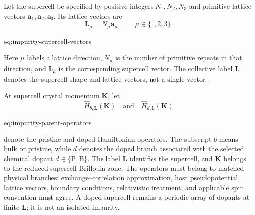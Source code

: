 Let the supercell be specified by positive integers
$N_1,N_2,N_3$ and primitive lattice vectors
$\mathbf a_1,\mathbf a_2,\mathbf a_3$. Its lattice vectors are
\begin{equation}
    \mathbf L_{\mu}=N_{\mu}\mathbf a_{\mu},
    \qquad \mu\in\{1,2,3\}.
    \label{eq:impurity-supercell-vectors}
\end{equation}
\begin{equationterms}{eq:impurity-supercell-vectors}
\end{equationterms}
Here $\mu$ labels a lattice direction, $N_{\mu}$ is the number of primitive
repeats in that direction, and $\mathbf L_{\mu}$ is the corresponding
supercell vector. The collective label $\mathbf L$ denotes the supercell shape
and lattice vectors, not a single vector.

At supercell crystal momentum $\mathbf K$, let
\begin{equation}
    \widehat H_{b,\mathbf L}(\mathbf K)
    \quad\text{and}\quad
    \widehat H_{d,\mathbf L}(\mathbf K)
    \label{eq:impurity-parent-operators}
\end{equation}
\begin{equationterms}{eq:impurity-parent-operators}
\end{equationterms}
denote the pristine and doped Hamiltonian operators. The subscript $b$ means
bulk or pristine, while $d$ denotes the doped branch associated with the
selected chemical dopant $d\in\{\mathrm P,\mathrm B\}$. The label $\mathbf L$
identifies the supercell, and $\mathbf K$ belongs to the reduced supercell
Brillouin zone. The operators must belong to matched physical branches:
exchange--correlation
approximation, host pseudopotential, lattice vectors, boundary conditions,
relativistic treatment, and applicable spin convention must agree. A doped
supercell remains a periodic array of dopants at finite $\mathbf L$; it is not
an isolated impurity.


